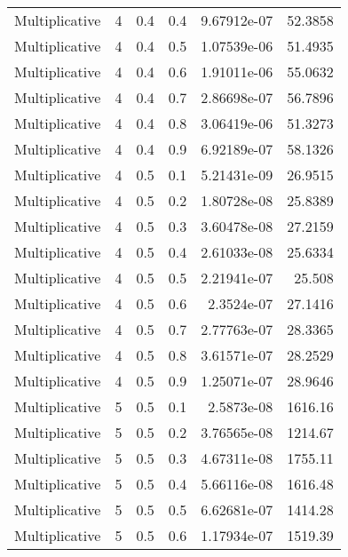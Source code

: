 \documentclass{article}
\begin{document}
\begin{longtable}[H]{lrrrrr}
 Multiplicative &       4 &   0.4 &            0.4 &   9.67912e-07 &         52.3858 \\
 Multiplicative &       4 &   0.4 &            0.5 &   1.07539e-06 &         51.4935 \\
 Multiplicative &       4 &   0.4 &            0.6 &   1.91011e-06 &         55.0632 \\
 Multiplicative &       4 &   0.4 &            0.7 &   2.86698e-07 &         56.7896 \\
 Multiplicative &       4 &   0.4 &            0.8 &   3.06419e-06 &         51.3273 \\
 Multiplicative &       4 &   0.4 &            0.9 &   6.92189e-07 &         58.1326 \\
 Multiplicative &       4 &   0.5 &            0.1 &   5.21431e-09 &         26.9515 \\
 Multiplicative &       4 &   0.5 &            0.2 &   1.80728e-08 &         25.8389 \\
 Multiplicative &       4 &   0.5 &            0.3 &   3.60478e-08 &         27.2159 \\
 Multiplicative &       4 &   0.5 &            0.4 &   2.61033e-08 &         25.6334 \\
 Multiplicative &       4 &   0.5 &            0.5 &   2.21941e-07 &         25.508  \\
 Multiplicative &       4 &   0.5 &            0.6 &   2.3524e-07  &         27.1416 \\
 Multiplicative &       4 &   0.5 &            0.7 &   2.77763e-07 &         28.3365 \\
 Multiplicative &       4 &   0.5 &            0.8 &   3.61571e-07 &         28.2529 \\
 Multiplicative &       4 &   0.5 &            0.9 &   1.25071e-07 &         28.9646 \\
 Multiplicative &       5 &   0.5 &            0.1 &   2.5873e-08  &       1616.16   \\
 Multiplicative &       5 &   0.5 &            0.2 &   3.76565e-08 &       1214.67   \\
 Multiplicative &       5 &   0.5 &            0.3 &   4.67311e-08 &       1755.11   \\
 Multiplicative &       5 &   0.5 &            0.4 &   5.66116e-08 &       1616.48   \\
 Multiplicative &       5 &   0.5 &            0.5 &   6.62681e-07 &       1414.28   \\
 Multiplicative &       5 &   0.5 &            0.6 &   1.17934e-07 &       1519.39   \\

\end{longtable}
\end{document}
